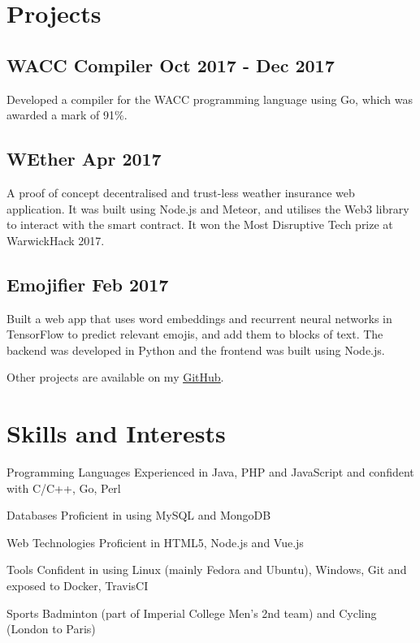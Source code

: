 \documentclass[a4paper]{article}
\begin{document}
\section*{Projects}

\subsection*{WACC Compiler \hfill Oct 2017 - Dec 2017}

Developed a compiler for the WACC programming language using Go, which was awarded a mark of 91\%.

\subsection*{WEther \hfill Apr 2017}

A proof of concept decentralised and trust-less weather insurance web application. It was built using Node.js and Meteor, and utilises the Web3 library to interact with the smart contract. It won the Most Disruptive Tech prize at WarwickHack 2017.

\subsection*{Emojifier \hfill Feb 2017}

Built a web app that uses word embeddings and recurrent neural networks in TensorFlow to predict relevant emojis, and add them to blocks of text. The backend was developed in Python and the frontend was built using Node.js.

\vspace{6pt}

Other projects are available on my \href{https://github.com/Qiang-Feng}{\underline{GitHub}}.

\section*{Skills and Interests}

\vspace{6pt}

\begin{eqlist}
    \item[Programming Languages] Experienced in Java, PHP and JavaScript and confident with C/C++, Go, Perl
    \item[Databases] Proficient in using MySQL and MongoDB
    \item[Web Technologies] Proficient in HTML5, Node.js and Vue.js
    \item[Tools] Confident in using Linux (mainly Fedora and Ubuntu), Windows, Git and exposed to Docker, TravisCI
    \item[Sports] Badminton (part of Imperial College Men's 2nd team) and Cycling (London to Paris)
\end{eqlist}
\end{document}
